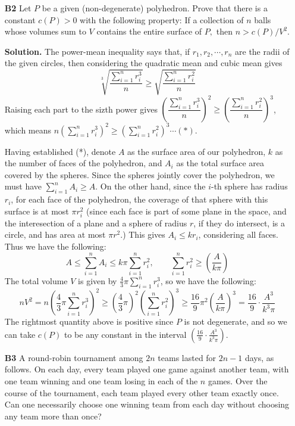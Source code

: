 \documentclass[11pt,a4paper]{article}
\newcommand{\<}{\langle}
\renewcommand{\>}{\rangle}
\begin{document}
\begin{enumerate}
	\item[\textbf{B2}] Let $P$ be a given (non-degenerate) polyhedron. Prove that there is a constant $c(P)>0$ with the following property: If a collection of $n$ balls whose volumes sum to $V$ contains the entire surface of $P,$ then $n>c(P)/V^2.$
	
	\textbf{Solution.} The power-mean inequality says that, if $r_1, r_2, \cdots , r_n$ are the radii of the given circles, then considering the quadratic mean and cubic mean gives
	\[\sqrt[3]{\frac{\sum_{i=1}^n r_i^3}{n}}\ge \sqrt{\frac{\sum_{i=1}^n r_i^2}{n}}\]
	Raising each part to the sizth power gives $\left(\dfrac{\sum_{i=1}^n r_i^3}{n}\right)^2\ge \left(\dfrac{\sum_{i=1}^n r_i^2}{n}\right)^3$, which means $n(\sum_{i=1}^n r_i^3)^2\ge (\sum_{i=1}^n r_i^2)^3\cdots (*)$. 
	
	Having established (*), denote $A$ as the surface area of our polyhedron, $k$ as the number of faces of the polyhedron, and $A_i$ as the total surface area covered by the spheres. Since the spheres jointly cover the polyhedron, we must have $\sum_{i=1}^n A_i\ge A$. On the other hand, since the $i$-th sphere has radius $r_i$, for each face of the polyhedron, the coverage of that sphere with this surface is at most $\pi r_i^2$ (since each face is part of some plane in the space, and the interesection of a plane and a sphere of radius $r$, if they do intersect, is a circle, and has area at most $\pi r^2$.) This gives $A_i\le kr_i$, considering all faces. Thus we have the following: 
	\[A\le \sum_{i=1}^n A_i\le k\pi \sum_{i=1}^n r_i^2, \qquad \sum_{i=1}^n r_i^2\ge \left(\frac{A}{k\pi}\right)\]
	The total volume $V$ is given by $\frac 43 \pi \sum_{i=1}^n r_i^3$, so we have the following: 
	\[nV^2 = n\left(\frac 43 \pi \sum_{i=1}^n r_i^3\right)^2\ge \left(\frac 43 \pi \right)^2 \left(\sum_{i=1}^n r_i^2\right)^3 \ge \frac {16}{9} \pi ^2 \left(\frac{A}{k\pi}\right)^3=\frac{16}{9}\cdot \frac{A^3}{k^3\pi}\]
	The rightmost quantity above is positive since $P$ is not degenerate, and so we can take $c(P)$ to be any constant in the interval $\left(\frac{16}{9}\cdot \frac{A^3}{k^3\pi}\right)$. 
	
	\item[\textbf{B3}]A round-robin tournament among $2n$ teams lasted for $2n-1$ days, as follows. On each day, every team played one game against another team, with one team winning and one team losing in each of the $n$ games. Over the course of the tournament, each team played every other team exactly once. Can one necessarily choose one winning team from each day without choosing any team more than once?
	

\end{enumerate}
\end{document}
